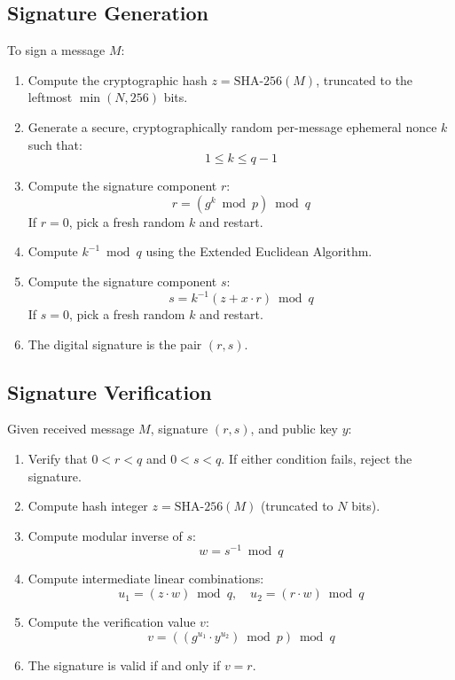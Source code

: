 \subsection{Signature Generation}
To sign a message $M$:
\begin{enumerate}
    \item Compute the cryptographic hash $z = \text{SHA-256}(M)$, truncated to the leftmost $\min(N, 256)$ bits.
    \item Generate a secure, cryptographically random per-message ephemeral nonce $k$ such that:
    \begin{equation}
    1 \le k \le q - 1
    \end{equation}
    \item Compute the signature component $r$:
    \begin{equation}
    r = (g^k \bmod p) \bmod q
    \end{equation}
    If $r = 0$, pick a fresh random $k$ and restart.
    \item Compute $k^{-1} \bmod q$ using the Extended Euclidean Algorithm.
    \item Compute the signature component $s$:
    \begin{equation}
    s = k^{-1} (z + x \cdot r) \bmod q
    \end{equation}
    If $s = 0$, pick a fresh random $k$ and restart.
    \item The digital signature is the pair $(r, s)$.
\end{enumerate}

\subsection{Signature Verification}
Given received message $M$, signature $(r, s)$, and public key $y$:
\begin{enumerate}
    \item Verify that $0 < r < q$ and $0 < s < q$. If either condition fails, reject the signature.
    \item Compute hash integer $z = \text{SHA-256}(M)$ (truncated to $N$ bits).
    \item Compute modular inverse of $s$:
    \begin{equation}
    w = s^{-1} \bmod q
    \end{equation}
    \item Compute intermediate linear combinations:
    \begin{equation}
    u_1 = (z \cdot w) \bmod q, \quad u_2 = (r \cdot w) \bmod q
    \end{equation}
    \item Compute the verification value $v$:
    \begin{equation}
    v = \left( (g^{u_1} \cdot y^{u_2}) \bmod p \right) \bmod q
    \end{equation}
    \item The signature is valid if and only if $v = r$.
\end{enumerate}

